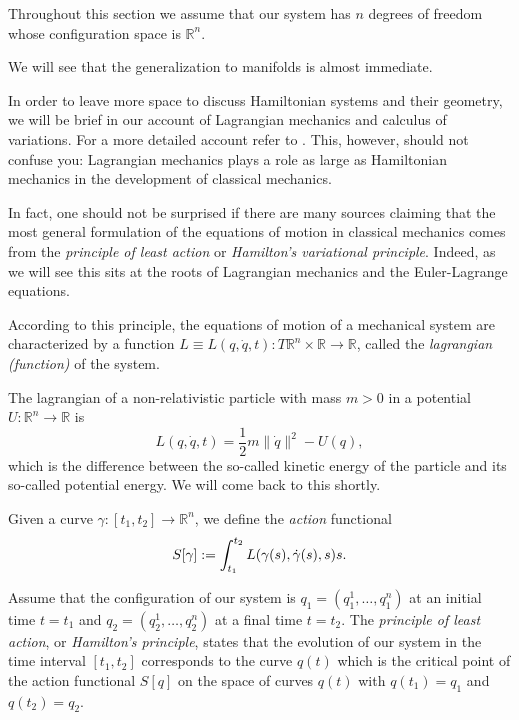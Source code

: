 \documentclass[english,fontsize=11pt,paper=a5,oneside]{scrbook}
\newcommand{\R}{\mathbb{R}}
\let\d\relax
\DeclareMathOperator{\d}{d}
\theoremstyle{definition}
\newenvironment{example}
  {\pushQED{\qed}\renewcommand{\qedsymbol}{$\lozenge$}\examplex}
  {\popQED\endexamplex}
\begin{document}
\begin{tcolorbox}
    Throughout this section we assume that our system has $n$ degrees of freedom whose configuration space is $\R^n$.    
\end{tcolorbox}
We will see that the generalization to manifolds is almost immediate.

In order to leave more space to discuss Hamiltonian systems and their geometry, we will be brief in our account of Lagrangian mechanics and calculus of variations. For a more detailed account refer to \cite[Part II]{book:arnold}.
This, however, should not confuse you: Lagrangian mechanics plays a role as large as Hamiltonian mechanics in the development of classical mechanics.

In fact, one should not be surprised if there are many sources claiming that the most general formulation of the equations of motion in classical mechanics comes from the \emph{principle of least action} or \emph{Hamilton's variational principle}. Indeed, as we will see this sits at the roots of Lagrangian mechanics and the Euler-Lagrange equations.

According to this principle, the equations of motion of a mechanical system are characterized by a function $L \equiv L(q, \dot q, t) : T\R^n \times \R \to \R$, called the \emph{lagrangian (function)} of the system.

\begin{example}
    The lagrangian of a non-relativistic particle with mass $m > 0$ in a potential $U : \R^n \to \R$ is
    \begin{equation}
        L(q, \dot q, t) = \frac12 m \|\dot q\|^2 - U(q),
    \end{equation}
    which is the difference between the so-called kinetic energy of the particle and its so-called potential energy.
    We will come back to this shortly.
\end{example}

Given a curve $\gamma:[t_1, t_2] \to \R^n$, we define the \emph{action} functional
\begin{equation}\label{eq:Laction}
    S[\gamma] := \int_{t_1}^{t_2} L(\gamma(s), \dot \gamma(s), s) \d s.
\end{equation}

\begin{tcolorbox}
    Assume that the configuration of our system is $q_1 = (q_1^1, \ldots, q_1^n)$ at an initial time $t=t_1$ and $q_2 = (q_2^1, \ldots, q_2^n)$ at a final time $t = t_2$. The \emph{principle of least action}, or \emph{Hamilton's principle}, states that the evolution of our system in the time interval $[t_1, t_2]$ corresponds to the curve $q(t)$ which is the critical point of the action functional $S[q]$ on the space of curves $q(t)$ with $q(t_1) = q_1$ and $q(t_2) = q_2$.
\end{tcolorbox}
\end{document}
